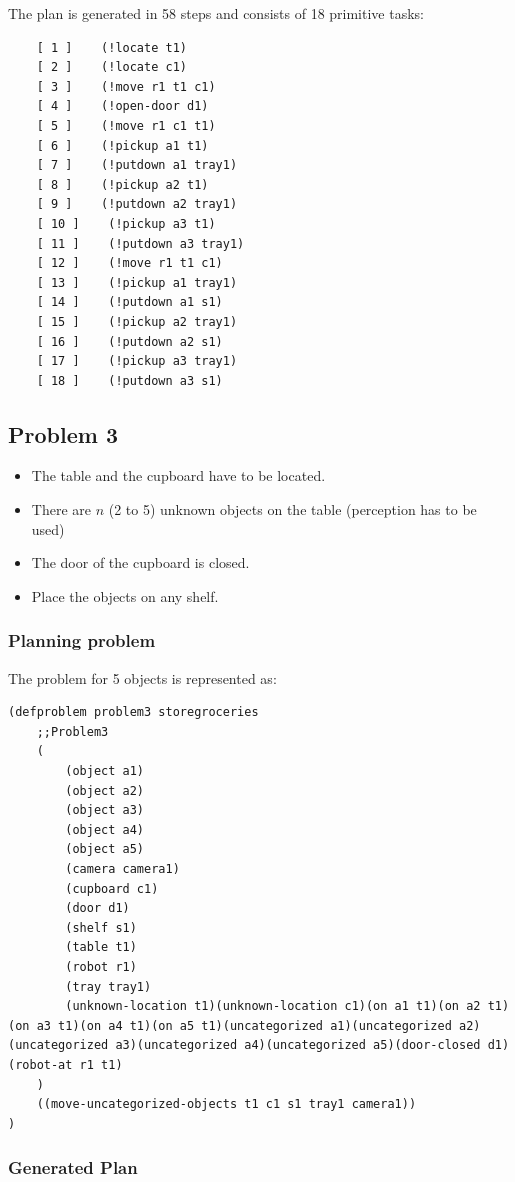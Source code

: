 \documentclass[paper=a4, fontsize=11pt]{scrartcl}
\begin{document}
	The plan is generated in 58 steps and consists of 18 primitive tasks:
	
	\begin{lstlisting}
	[ 1 ]    (!locate t1)
	[ 2 ]    (!locate c1)
	[ 3 ]    (!move r1 t1 c1)
	[ 4 ]    (!open-door d1)
	[ 5 ]    (!move r1 c1 t1)
	[ 6 ]    (!pickup a1 t1)
	[ 7 ]    (!putdown a1 tray1)
	[ 8 ]    (!pickup a2 t1)
	[ 9 ]    (!putdown a2 tray1)
	[ 10 ]    (!pickup a3 t1)
	[ 11 ]    (!putdown a3 tray1)
	[ 12 ]    (!move r1 t1 c1)
	[ 13 ]    (!pickup a1 tray1)
	[ 14 ]    (!putdown a1 s1)
	[ 15 ]    (!pickup a2 tray1)
	[ 16 ]    (!putdown a2 s1)
	[ 17 ]    (!pickup a3 tray1)
	[ 18 ]    (!putdown a3 s1)
	\end{lstlisting}
		
	\subsection{Problem 3}
	
		\begin{itemize}
			\item The table and the cupboard have to be located.
			\item There are $n$ (2 to 5) unknown objects on the table (perception has to be used)
			\item The door of the cupboard is closed.
			\item Place the objects on any shelf.
		\end{itemize}
	
	\subsubsection*{Planning problem}
	
	The problem for 5 objects is represented as:
	
	\begin{lstlisting}
(defproblem problem3 storegroceries
	;;Problem3
	(
		(object a1)
		(object a2)
		(object a3)
		(object a4)
		(object a5)
		(camera camera1)
		(cupboard c1)
		(door d1)
		(shelf s1)
		(table t1)
		(robot r1)
		(tray tray1)
		(unknown-location t1)(unknown-location c1)(on a1 t1)(on a2 t1)(on a3 t1)(on a4 t1)(on a5 t1)(uncategorized a1)(uncategorized a2)(uncategorized a3)(uncategorized a4)(uncategorized a5)(door-closed d1)(robot-at r1 t1)
	)
	((move-uncategorized-objects t1 c1 s1 tray1 camera1))
)
	\end{lstlisting}
	
	\subsubsection*{Generated Plan}
	
\end{document}
